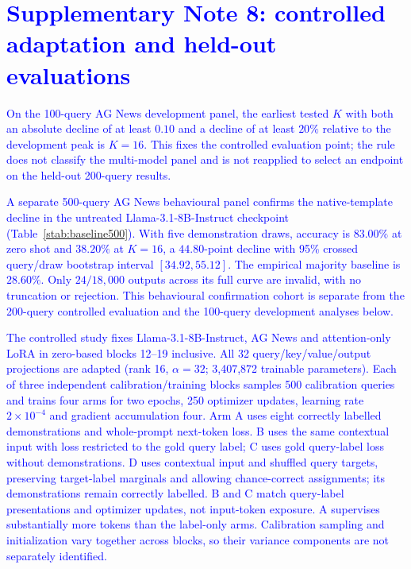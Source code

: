 \section*{\textcolor{blue}{Supplementary Note 8: controlled adaptation and held-out evaluations}}
\label{snote:controlled}

\textcolor{blue}{On the 100-query AG News development panel, the earliest tested $K$ with
both an absolute decline of at least $0.10$ and a decline of at least $20\%$ relative
to the development peak is $K=16$. This fixes the controlled evaluation point;
the rule does not classify the multi-model panel and is not reapplied to select an
endpoint on the held-out 200-query results.}

\textcolor{blue}{A separate 500-query AG News behavioural panel confirms the native-template
decline in the untreated Llama-3.1-8B-Instruct checkpoint
(Table~\ref{stab:baseline500}). With five demonstration draws, accuracy is $83.00\%$
at zero shot and $38.20\%$ at $K=16$, a $44.80$-point decline with 95\% crossed
query/draw bootstrap interval $[34.92,55.12]$. The empirical majority baseline is
$28.60\%$. Only $24/18,000$ outputs across its full curve are invalid, with no
truncation or rejection. This behavioural confirmation cohort is separate from the
200-query controlled evaluation and the 100-query development analyses below.}

\textcolor{blue}{The controlled study fixes Llama-3.1-8B-Instruct, AG News and attention-only
LoRA in zero-based blocks 12--19 inclusive. All 32 query/key/value/output projections
are adapted (rank 16, $\alpha=32$; 3,407,872 trainable parameters). Each of three
independent calibration/training blocks samples 500 calibration queries and trains four
arms for two epochs, 250 optimizer updates, learning rate $2\times10^{-4}$ and gradient
accumulation four. Arm A uses eight correctly labelled demonstrations and whole-prompt
next-token loss. B uses the same contextual input with loss restricted to the gold query
label; C uses gold query-label loss without demonstrations. D uses contextual input
and shuffled query targets, preserving target-label marginals and allowing chance-correct
assignments; its demonstrations remain correctly labelled. B and C match query-label
presentations and optimizer updates, not input-token exposure. A supervises substantially
more tokens than the label-only arms. Calibration sampling and initialization vary
together across blocks, so their variance components are not separately identified.}

